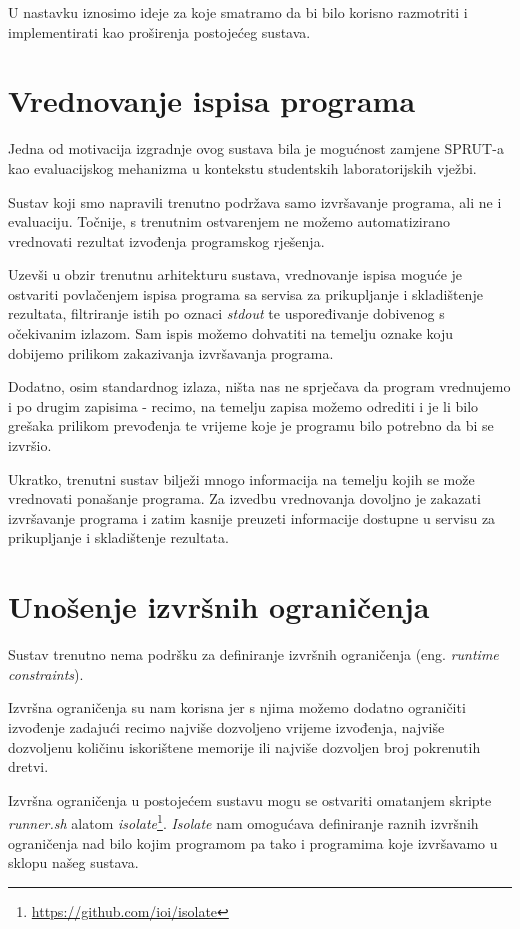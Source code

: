 \documentclass[times, utf8, zavrsni]{fer}
\begin{document}
{U nastavku iznosimo ideje za koje smatramo da bi bilo korisno razmotriti i implementirati kao proširenja postojećeg sustava.

\section{Vrednovanje ispisa programa}

Jedna od motivacija izgradnje ovog sustava bila je mogućnost zamjene SPRUT-a kao evaluacijskog mehanizma u kontekstu studentskih laboratorijskih vježbi.

Sustav koji smo napravili trenutno podržava samo izvršavanje programa, ali ne i evaluaciju. Točnije, s trenutnim ostvarenjem ne možemo automatizirano vrednovati rezultat izvođenja programskog rješenja.

Uzevši u obzir trenutnu arhitekturu sustava, vrednovanje ispisa moguće je ostvariti povlačenjem ispisa programa sa servisa za prikupljanje i skladištenje rezultata, filtriranje istih po oznaci {\textit{stdout}} te uspoređivanje dobivenog s očekivanim izlazom. Sam ispis možemo dohvatiti na temelju oznake koju dobijemo prilikom zakazivanja izvršavanja programa.

Dodatno, osim standardnog izlaza, ništa nas ne sprječava da program vrednujemo i po drugim zapisima - recimo, na temelju zapisa možemo odrediti i je li bilo grešaka prilikom prevođenja te vrijeme koje je programu bilo potrebno da bi se izvršio.

Ukratko, trenutni sustav bilježi mnogo informacija na temelju kojih se može vrednovati ponašanje programa. Za izvedbu vrednovanja dovoljno je zakazati izvršavanje programa i zatim kasnije preuzeti informacije dostupne u servisu za prikupljanje i skladištenje rezultata.

\section{Unošenje izvršnih ograničenja}

Sustav trenutno nema podršku za definiranje izvršnih ograničenja (eng. {\textit{runtime constraints}}).

Izvršna ograničenja su nam korisna jer s njima možemo dodatno ograničiti izvođenje zadajući recimo najviše dozvoljeno vrijeme izvođenja, najviše dozvoljenu količinu iskorištene memorije ili najviše dozvoljen broj pokrenutih dretvi.

Izvršna ograničenja u postojećem sustavu mogu se ostvariti omatanjem skripte {\textit{runner.sh}} alatom {\textit{isolate}}\footnote{\url{https://github.com/ioi/isolate}}. {\textit{Isolate}} nam omogućava definiranje raznih izvršnih ograničenja nad bilo kojim programom pa tako i programima koje izvršavamo u sklopu našeg sustava.

}
\end{document}
